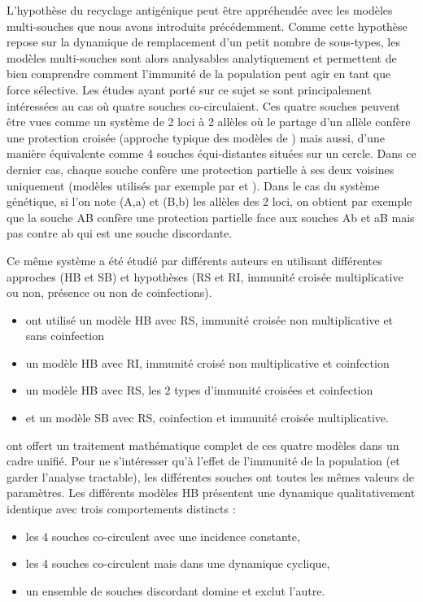 L'hypothèse du recyclage antigénique peut être appréhendée avec les
modèles multi-souches que nous avons introduits précédemment. Comme
cette hypothèse repose sur la dynamique de remplacement d'un petit
nombre de sous-types, les modèles multi-souches sont alors analysables
analytiquement et permettent de bien comprendre comment l'immunité de
la population peut agir en tant que force sélective. Les études ayant
porté sur ce sujet se sont principalement intéressées au cas où quatre
souches co-circulaient. Ces quatre souches peuvent être vues comme un
système de 2 loci à 2 allèles où le partage d'un allèle confère une
protection croisée (approche typique des modèles de \citet{Gupta1998})
mais aussi, d'une manière équivalente comme 4 souches équi-distantes
situées sur un cercle. Dans ce dernier cas, chaque souche confère une
protection partielle à ses deux voisines uniquement (modèles utilisés
par exemple par \citet{Andreasen1997} et \cite{Gog2002a}). Dans le cas
du système génétique, si l'on note (A,a) et (B,b) les allèles des 2
loci, on obtient par exemple que la souche AB confère une protection
partielle face aux souches Ab et aB mais pas contre ab qui est une
souche discordante.

Ce même système a été étudié par différents auteurs en utilisant
différentes approches (HB et SB) et hypothèses (RS et RI, immunité
croisée multiplicative ou non, présence ou non de coinfections).
\begin{itemize}
\item \citet{Andreasen1997} ont utilisé un modèle HB avec RS, immunité
  croisée non multiplicative et sans coinfection
\item \citet{Gupta1998} un modèle HB avec RI, immunité croisé non
  multiplicative et coinfection
\item \cite{Gomes2002} un modèle HB avec RS, les 2 types d'immunité
  croisées et coinfection
\item et \cite{Gog2002a} un modèle SB avec RS, coinfection et immunité
  croisée multiplicative.
\end{itemize}

\cite{Dawes2002} ont offert un traitement mathématique complet de ces
quatre modèles dans un cadre unifié. Pour ne s'intéresser qu'à l'effet de
l'immunité de la population (et garder l'analyse tractable), les
différentes souches ont toutes les mêmes valeurs de paramètres. Les
différents modèles HB présentent une dynamique qualitativement
identique avec trois comportements distincts :
\begin{itemize}
\item les 4 souches co-circulent avec une incidence constante,
\item les 4 souches co-circulent mais dans une dynamique cyclique,
\item un ensemble de souches discordant domine et exclut l'autre.
\end{itemize}

